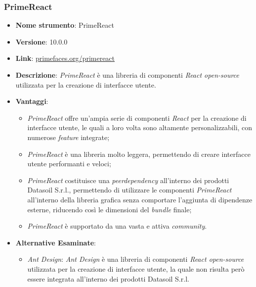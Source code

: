 \subsubsection{PrimeReact}
\begin{itemize}
      \item \textbf{Nome strumento}: PrimeReact
      \item \textbf{Versione}: 10.0.0
      \item \textbf{Link}: \href{https://primefaces.org/primereact}{primefaces.org/primereact}
      \item \textbf{Descrizione}: \textit{PrimeReact} è una libreria di componenti \textit{React open-source} utilizzata per la creazione di interfacce utente.
      \item \textbf{Vantaggi}:
            \begin{itemize}
                  \item \textit{PrimeReact} offre un'ampia serie di componenti \textit{React} per la creazione di interfacce utente, le quali a loro volta sono altamente personalizzabili, con numerose \textit{feature} integrate;
                  \item \textit{PrimeReact} è una libreria molto leggera, permettendo di creare interfacce utente performanti e veloci;
                  \item \textit{PrimeReact} costituisce una \textit{\gls{peerdependency}\glox} all'interno dei prodotti Datasoil S.r.l., permettendo di utilizzare le componenti \textit{PrimeReact} all'interno
                        della libreria grafica senza comportare l'aggiunta di dipendenze esterne, riducendo così le dimensioni del \textit{bundle} finale;
                  \item \textit{PrimeReact} è supportato da una vasta e attiva \textit{community}.
            \end{itemize}
      \item \textbf{Alternative Esaminate}:
            \begin{itemize}
                  \item \textit{Ant Design}: \textit{Ant Design} è una libreria di componenti \textit{React open-source} utilizzata per la creazione di interfacce utente, la quale non risulta però
                        essere integrata all'interno dei prodotti Datasoil S.r.l.
            \end{itemize}
\end{itemize}


